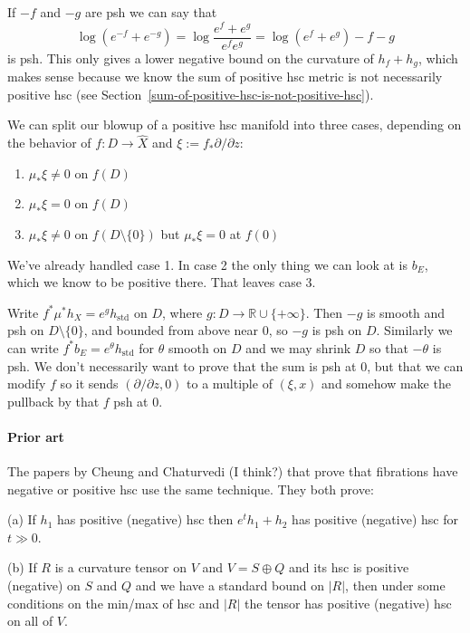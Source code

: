 \documentclass[11pt]{article}
\theoremstyle{definition}
\newcommand{\kk}[1]{\mathbb{#1}}
\begin{document}
If $-f$ and $-g$ are psh we can say that
$$
\log(e^{-f} + e^{-g})
= \log \frac{e^f + e^g}{e^f e^g}
= \log (e^f + e^g) - f - g
$$
is psh.
This only gives a lower negative bound on the curvature of $h_f + h_g$,
which makes sense because we know the sum of positive hsc metric is not
necessarily positive hsc (see
Section~\ref{sum-of-positive-hsc-is-not-positive-hsc}).

We can split our blowup of a positive hsc manifold into three cases, depending
on the behavior of $f : D \to \widehat X$ and $\xi := f_*\partial / \partial z$:
\begin{enumerate}
\item
$\mu_* \xi \not= 0$ on $f(D)$

\item
$\mu_* \xi = 0$ on $f(D)$

\item
$\mu_* \xi \not= 0$ on $f(D \setminus \{0\})$ but $\mu_* \xi = 0$ at $f(0)$
\end{enumerate}
We've already handled case 1.
In case 2 the only thing we can look at is $b_E$, which we know to be positive there.
That leaves case 3.

Write $f^*\mu^*h_X = e^g h_{\text{std}}$ on $D$, where $g : D \to \kk R \cup
\{+\infty\}$.
Then $-g$ is smooth and psh on $D \setminus \{0\}$, and bounded from above near
$0$, so $-g$ is psh on $D$.
Similarly we can write $f^* b_E = e^{\theta} h_{\text{std}}$ for $\theta$
smooth on $D$ and we may shrink $D$ so that $-\theta$ is psh.
We don't necessarily want to prove that the sum is psh at $0$, but that we can
modify $f$ so it sends $(\partial/\partial z, 0)$ to a multiple of $(\xi, x)$ and
somehow make the pullback by that $f$ psh at $0$.


\paragraph{Prior art}
The papers by Cheung and Chaturvedi (I think?) that prove that fibrations have
negative or positive hsc use the same technique.
They both prove:

(a) If $h_1$ has positive (negative) hsc then $e^t h_1 + h_2$ has positive
(negative) hsc for $t \gg 0$.

(b) If $R$ is a curvature tensor on $V$ and $V = S \oplus Q$ and its hsc is
positive (negative) on $S$ and $Q$ and we have a standard bound on $|R|$, then
under some conditions on the min/max of hsc and $|R|$ the tensor has positive
(negative) hsc on all of $V$.
\end{document}
